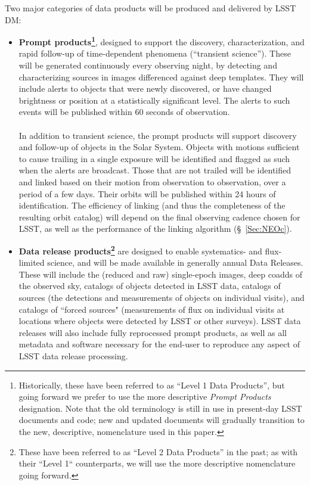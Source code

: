 Two major categories of data products will be produced and delivered by LSST DM:
\begin{itemize}
\item {\bf   Prompt products\footnote{Historically, these have been referred to as ``Level
1 Data Products'', but going forward we prefer to use the more descriptive
{\em Prompt Products} designation. Note that the old terminology is still
in use in present-day LSST documents and code; new and updated
documents will gradually transition to the new, descriptive, nomenclature
used in this paper.
}}, designed to support the discovery,
  characterization, and rapid follow-up of time-dependent phenomena
  (``transient science''). These will be generated continuously every
  observing night, by detecting and characterizing sources in images
  differenced against deep templates. They will include alerts to
  objects that were newly discovered, or have changed brightness or
  position at a statistically significant level. The alerts to such
  events will be published within 60   seconds of observation.\\
\\
In addition to transient science, the prompt products will support
discovery and follow-up of objects in the Solar System. Objects with
motions sufficient to cause trailing in a single exposure will be
identified and flagged as such when the alerts are broadcast. Those
that are not trailed will be identified and linked based on their
motion from observation to observation, over a period of a few
days. Their orbits will be published within 24 hours of
identification. The efficiency of linking (and thus the completeness
of the resulting orbit catalog) will depend on the final observing
cadence chosen for LSST, as well as the performance of the linking
algorithm (\S~\ref{Sec:NEOc}).
\item {\bf Data release products\footnote{These have been referred to as ``Level
2 Data Products'' in the past; as with their ``Level 1`` counterparts, we
will use the more descriptive nomenclature going forward.}} are designed to enable systematics- and flux-limited science, and will be made available in generally annual Data Releases. These will include the (reduced and raw) single-epoch images, deep coadds of the observed sky, catalogs of objects detected in LSST data, catalogs of sources (the detections and measurements of objects on individual visits), and catalogs of ``forced sources" (measurements of flux on individual visits at locations where objects were detected by LSST or other surveys). LSST data releases will also include fully reprocessed prompt products, as well as all metadata and software necessary for the end-user to reproduce any aspect of LSST data release processing.\\

\end{itemize}
